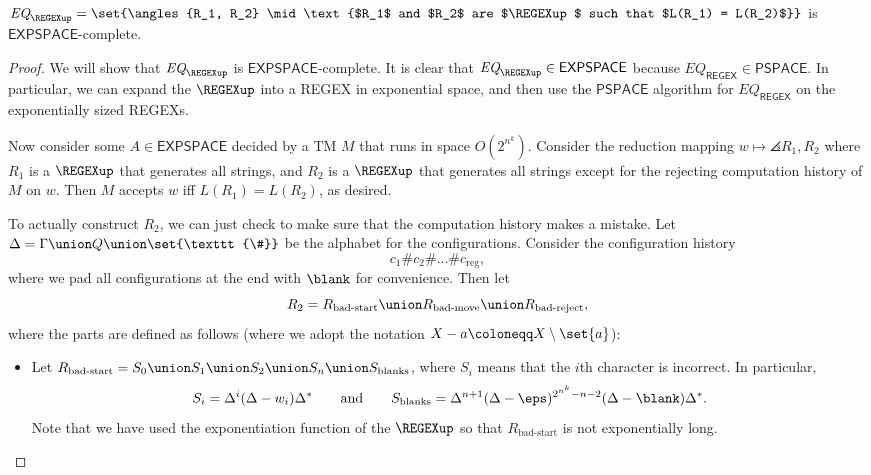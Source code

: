 \documentclass{standalone}
\begin{document}
\begin{theorem}
	\(\textit{EQ}_{\REGEXup} = \set{\angles{R_1, R_2} \mid \text{%
		$R_1$ and $R_2$ are $\REGEXup$ such that $L(R_1) = L(R_2)$%
	}}\) is \(\mathsf{EXPSPACE}\)-complete.
\end{theorem}
\begin{proof}
	We will show that \(\textit{EQ}_{\REGEXup}\) is \(\mathsf{EXPSPACE}\)-complete. It is clear that \(\textit{EQ}_{\REGEXup} \in \mathsf{EXPSPACE}\) because \(\textit{EQ}_{\textsf{REGEX}} \in \mathsf{PSPACE}\). In particular, we can expand the \(\REGEXup\) into a \textsf{REGEX} in exponential space, and then use the \(\mathsf{PSPACE}\) algorithm for \(\textit{EQ}_{\textsf{REGEX}}\) on the exponentially sized \textsf{REGEX}s.

	Now consider some \(A \in \mathsf{EXPSPACE}\) decided by a \textsf{TM} \(M\) that runs in space \(O(2^{n^k})\). Consider the reduction mapping \(w \mapsto \angles{R_1, R_2}\) where \(R_1\) is a \(\REGEXup\) that generates all strings, and \(R_2\) is a \(\REGEXup\) that generates all strings except for the rejecting computation history of \(M\) on \(w\). Then \(M\) accepts \(w\) iff \(L(R_1) = L(R_2)\), as desired.

	To actually construct \(R_2\), we can just check to make sure that the computation history makes a mistake. Let \(\Delta = \Gamma \union Q \union \set{\texttt{\#}}\) be the alphabet for the configurations.
	Consider the configuration history
	\[
		c_1 \texttt{\#} c_2 \texttt{\#} \dots \texttt{\#} c_{\text{reg}},
	\]
	where we pad all configurations at the end with \(\blank\) for convenience. Then let
	\[
		R_2 = R_{\text{bad-start}} \union R_{\text{bad-move}} \union R_{\text{bad-reject}},
	\]
	where the parts are defined as follows
  (where we adopt the notation \(X - a \coloneqq X \setminus \set{a}\)):
	\begin{itemize}
		\item Let
          \(R_{\text{bad-start}} =
            S_0 \union S_1 \union S_2 \union S_n \union S_{\text{blanks}}\),
          where \(S_i\) means that the \(i\)th character is incorrect.
          In particular,
          \[
            S_i = \Delta^i (\Delta - w_i) \Delta^*
              \qquad \text{and} \qquad
              S_{\text{blanks}} = \Delta^{n + 1}
                                  (\Delta - \eps)^{2^{n^k} - n - 2}
                                  (\Delta - \blank) \Delta^*.
          \]
          Note that we have used the exponentiation function of
          the \(\REGEXup\) so that \(R_{\text{bad-start}}\) is not
          exponentially long.


\end{itemize}
\end{proof}
\end{document}

